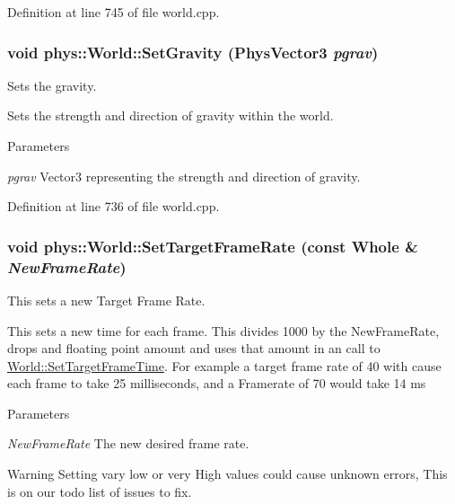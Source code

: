 Definition at line 745 of file world.cpp.

\hypertarget{classphys_1_1World_a3779f811ca8a394a20fc2d92823b5f93}{
\subsubsection[{SetGravity}]{\setlength{\rightskip}{0pt plus 5cm}void phys::World::SetGravity ({\bf PhysVector3} {\em pgrav})}}
\label{da/ddf/classphys_1_1World_a3779f811ca8a394a20fc2d92823b5f93}


Sets the gravity. 

Sets the strength and direction of gravity within the world. 
\begin{DoxyParams}{Parameters}
\item[{\em pgrav}]Vector3 representing the strength and direction of gravity. \end{DoxyParams}


Definition at line 736 of file world.cpp.

\hypertarget{classphys_1_1World_a76dfcde35392291aafd6eb1a64b3c95c}{
\subsubsection[{SetTargetFrameRate}]{\setlength{\rightskip}{0pt plus 5cm}void phys::World::SetTargetFrameRate (const {\bf Whole} \& {\em NewFrameRate})}}
\label{da/ddf/classphys_1_1World_a76dfcde35392291aafd6eb1a64b3c95c}


This sets a new Target Frame Rate. 

This sets a new time for each frame. This divides 1000 by the NewFrameRate, drops and floating point amount and uses that amount in an call to \hyperlink{classphys_1_1World_ad95b5a5ad73e0a05826b5bd834876333}{World::SetTargetFrameTime}. For example a target frame rate of 40 with cause each frame to take 25 milliseconds, and a Framerate of 70 would take 14 ms 
\begin{DoxyParams}{Parameters}
\item[{\em NewFrameRate}]The new desired frame rate. \end{DoxyParams}
\begin{DoxyWarning}{Warning}
Setting vary low or very High values could cause unknown errors, This is on our todo list of issues to fix. 
\end{DoxyWarning}


